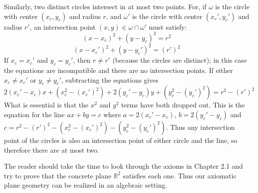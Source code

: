 \documentclass[leqno]{book}
\begin{document}
Similarly, two distinct circles intersect in at most two points.  For, if $\omega$ is the circle with center $(x_c,y_c)$ and radius $r$, and $\omega'$ is the circle with center $(x_c',y_c')$ and radius $r'$, an intersection point $(x,y)\in\omega\cap\omega'$ must satisfy:
$$(x-x_c)^2+(y-y_c)^2=r^2$$
$$(x-x_c')^2+(y-y_c')^2=(r')^2$$
If $x_c=x_c'$ and $y_c=y_c'$, then $r\ne r'$ (because the circles are distinct); in this case the equations are incompatible and there are no intersection points.  If either $x_c\ne x_c'$ or $y_c\ne y_c'$, subtracting the equations gives
$$2(x_c'-x_c)x+(x_c^2-(x_c')^2)+2(y_c'-y_c)y+(y_c^2-(y_c')^2)=r^2-(r')^2$$
What is essential is that the $x^2$ and $y^2$ terms have both dropped out.  This is the equation for the line $ax+by=c$ where $a=2(x_c'-x_c)$, $b=2(y_c'-y_c)$ and $c=r^2-(r')^2-(x_c^2-(x_c')^2)-(y_c^2-(y_c')^2)$.  Thus any intersection point of the circles is also an intersection point of either circle and the line, so therefore there are at most two.

The reader should take the time to look through the axioms in Chapter 2.1 and try to prove that the concrete plane $\mathbb R^2$ satisfies each one.  Thus our axiomatic plane geometry can be realized in an algebraic setting.
\end{document}

